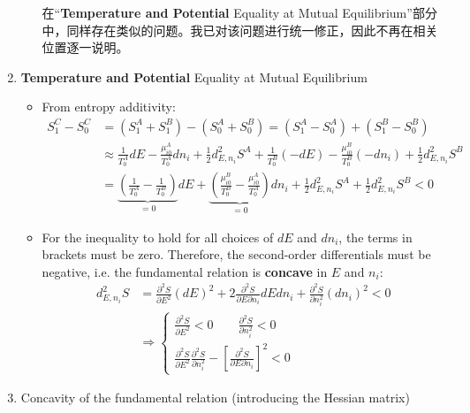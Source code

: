 \begin{thm}
\begin{enumerate}
\begin{itemize}
\begin{zhu}
    在“\textbf{Temperature and Potential} Equality at Mutual Equilibrium”部分中，同样存在类似的问题。我已对该问题进行统一修正，因此不再在相关位置逐一说明。
\end{zhu}
        \end{itemize}
        \item \textbf{Temperature and Potential} Equality at Mutual Equilibrium
        \begin{itemize}
            \item From entropy additivity:
            \begin{align*}
                S^C_1 - S^C_0 &= (S^A_1 + S^B_1) - (S^A_0 + S^B_0) = (S^A_1 - S^A_0) + (S^B_1 - S^B_0)\\
                &\approx \frac{1}{T^A_0} dE - \frac{\mu^A_{i0}}{T^A_0} dn_i + \frac{1}{2} d^2_{E,n_i} S^A
                + \frac{1}{T^B_0} (-dE) - \frac{\mu^B_{i0}}{T^B_0} (-dn_i) + \frac{1}{2} d^2_{E,n_i} S^B\\
                &= \underbrace{\left( \frac{1}{T^A_0} - \frac{1}{T^B_0} \right)}_{=0} dE + \underbrace{\left( \frac{\mu^B_{i0}}{T^B_0} 
                - \frac{\mu^A_{i0}}{T^A_0} \right)}_{=0} dn_i + \frac{1}{2} d^2_{E,n_i} S^A + \frac{1}{2} d^2_{E,n_i} S^B < 0
            \end{align*}
                \item For the inequality to hold for all choices of \( dE \) and \( dn_i \), 
                the terms in brackets must be zero. Therefore, the second-order differentials must be negative, 
                i.e. the fundamental relation is \textbf{concave} in \( E \) and \( n_i \):          
\begin{align*}
                d^2_{E,n_i} S &= \frac{\partial^2 S}{\partial E^2} (dE)^2 + 2 \frac{\partial^2 S}{\partial E \partial n_i} dEdn_i + \frac{\partial^2 S}{\partial n_i^2} (dn_i)^2 < 0\\
                &\Rightarrow
                \begin{cases} 
                \frac{\partial^2 S}{\partial E^2} < 0 \qquad \frac{\partial^2 S}{\partial n_i^2} < 0 \\ 
                \frac{\partial^2 S}{\partial E^2} \frac{\partial^2 S}{\partial n_i^2} - \left[ \frac{\partial^2 S}{\partial E \partial n_i} \right]^2 < 0 
                \end{cases}
\end{align*}
        \end{itemize}
    \item Concavity of the fundamental relation (introducing the Hessian matrix)


\end{enumerate}
\end{thm}
